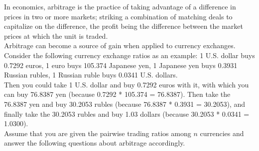 \documentclass[answers,addpoints,11pt]{exam}
\begin{document}
\begin{questions}
\begin{parts}
 \end{parts}

\newpage 

\question
In economics, arbitrage is the practice of taking advantage of a difference in prices in two or more markets; striking a combination of matching deals to capitalize on the difference, the profit being the difference between the market prices at which the unit is traded.\\

Arbitrage can become a source of gain when applied to currency exchanges. Consider the following currency exchange ratios as an example: 1 U.S. dollar buys 0.7292 euros, 
1 euro buys 105.374 Japanese yen, 1 Japanese yen buys 0.3931 Russian rubles, 1 Russian ruble buys 0.0341 U.S. dollars.\\

Then you could take 1 U.S. dollar and buy 0.7292 euros with it, with which you can buy 76.8387 yen (because 0.7292 * 105.374 = 76.8387). Then take the 76.8387 yen and buy 30.2053 rubles (because 76.8387 * 0.3931 = 30.2053), and finally take the 30.2053 rubles and buy 1.03 dollars (because 30.2053 * 0.0341 = 1.0300). \\

Assume that you are given the pairwise trading ratios among $n$ currencies and answer the following questions about arbitrage accordingly.

\end{questions}
\end{document}
